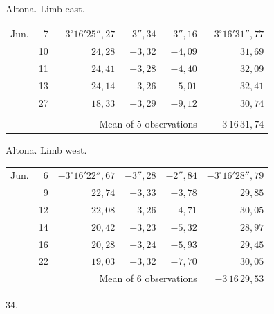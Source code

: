 \noindent\begin{minipage}[t]{.495\textwidth}\centering Altona. Limb east.\par\smallskip
{\scriptsize\setlength{\tabcolsep}{1pt}\renewcommand{\arraystretch}{1.2}\begin{tabular}{lr|r|r|r|r|}
Jun.&7&$-3^\circ16'25''{,}27$&$-3''{,}34$&$-3''{,}16$&$-3^\circ16'31''{,}77$\\
&10&$24{,}28$&$-3{,}32$&$-4{,}09$&$31{,}69$\\
&11&$24{,}41$&$-3{,}28$&$-4{,}40$&$32{,}09$\\
&13&$24{,}14$&$-3{,}26$&$-5{,}01$&$32{,}41$\\
&27&$18{,}33$&$-3{,}29$&$-9{,}12$&$30{,}74$\\
&&&&&\\
\cline{6-6}\multicolumn{5}{r}{Mean of 5 observations}&$-3\,16\,31{,}74$
\end{tabular}}\end{minipage}\hfill\begin{minipage}[t]{.495\textwidth}\centering Altona. Limb west.\par\smallskip
{\scriptsize\setlength{\tabcolsep}{1pt}\renewcommand{\arraystretch}{1.2}\begin{tabular}{lr|r|r|r|r}
Jun.&6&$-3^\circ16'22''{,}67$&$-3''{,}28$&$-2''{,}84$&$-3^\circ16'28''{,}79$\\
&9&$22{,}74$&$-3{,}33$&$-3{,}78$&$29{,}85$\\
&12&$22{,}08$&$-3{,}26$&$-4{,}71$&$30{,}05$\\
&14&$20{,}42$&$-3{,}23$&$-5{,}32$&$28{,}97$\\
&16&$20{,}28$&$-3{,}24$&$-5{,}93$&$29{,}45$\\
&22&$19{,}03$&$-3{,}32$&$-7{,}70$&$30{,}05$\\
\cline{6-6}\multicolumn{5}{r}{Mean of 6 observations}&$-3\,16\,29{,}53$
\end{tabular}}\end{minipage}
\par\vspace{4mm}
\begin{center}34.\end{center}

